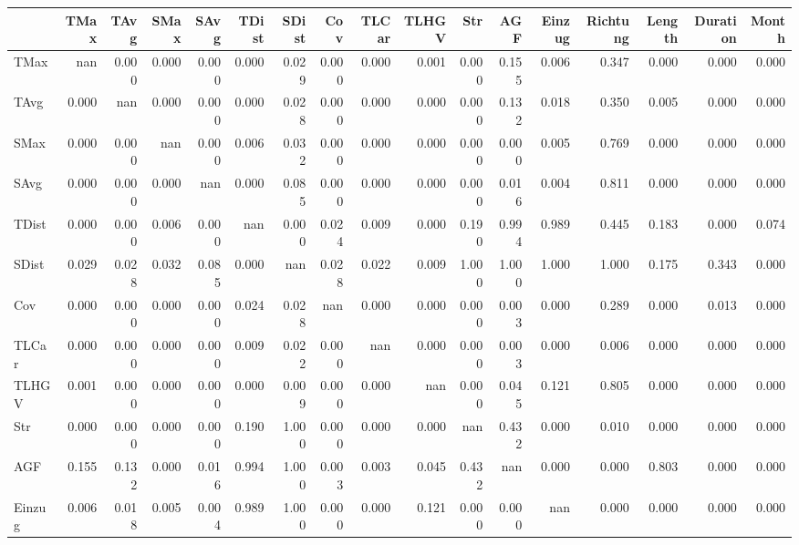 \begin{tabular}{lrrrrrrrrrrrrrrrr}
\toprule
{} &  TMax &  TAvg &  SMax &  SAvg &  TDist &  SDist &   Cov &  TLCar &  TLHGV &   Str &   AGF &  Einzug &  Richtung &  Length &  Duration &  Month \\
\midrule
TMax     &   nan & 0.000 & 0.000 & 0.000 &  0.000 &  0.029 & 0.000 &  0.000 &  0.001 & 0.000 & 0.155 &   0.006 &     0.347 &   0.000 &     0.000 &  0.000 \\
TAvg     & 0.000 &   nan & 0.000 & 0.000 &  0.000 &  0.028 & 0.000 &  0.000 &  0.000 & 0.000 & 0.132 &   0.018 &     0.350 &   0.005 &     0.000 &  0.000 \\
SMax     & 0.000 & 0.000 &   nan & 0.000 &  0.006 &  0.032 & 0.000 &  0.000 &  0.000 & 0.000 & 0.000 &   0.005 &     0.769 &   0.000 &     0.000 &  0.000 \\
SAvg     & 0.000 & 0.000 & 0.000 &   nan &  0.000 &  0.085 & 0.000 &  0.000 &  0.000 & 0.000 & 0.016 &   0.004 &     0.811 &   0.000 &     0.000 &  0.000 \\
TDist    & 0.000 & 0.000 & 0.006 & 0.000 &    nan &  0.000 & 0.024 &  0.009 &  0.000 & 0.190 & 0.994 &   0.989 &     0.445 &   0.183 &     0.000 &  0.074 \\
SDist    & 0.029 & 0.028 & 0.032 & 0.085 &  0.000 &    nan & 0.028 &  0.022 &  0.009 & 1.000 & 1.000 &   1.000 &     1.000 &   0.175 &     0.343 &  0.000 \\
Cov      & 0.000 & 0.000 & 0.000 & 0.000 &  0.024 &  0.028 &   nan &  0.000 &  0.000 & 0.000 & 0.003 &   0.000 &     0.289 &   0.000 &     0.013 &  0.000 \\
TLCar    & 0.000 & 0.000 & 0.000 & 0.000 &  0.009 &  0.022 & 0.000 &    nan &  0.000 & 0.000 & 0.003 &   0.000 &     0.006 &   0.000 &     0.000 &  0.000 \\
TLHGV    & 0.001 & 0.000 & 0.000 & 0.000 &  0.000 &  0.009 & 0.000 &  0.000 &    nan & 0.000 & 0.045 &   0.121 &     0.805 &   0.000 &     0.000 &  0.000 \\
Str      & 0.000 & 0.000 & 0.000 & 0.000 &  0.190 &  1.000 & 0.000 &  0.000 &  0.000 &   nan & 0.432 &   0.000 &     0.010 &   0.000 &     0.000 &  0.000 \\
AGF      & 0.155 & 0.132 & 0.000 & 0.016 &  0.994 &  1.000 & 0.003 &  0.003 &  0.045 & 0.432 &   nan &   0.000 &     0.000 &   0.803 &     0.000 &  0.000 \\
Einzug   & 0.006 & 0.018 & 0.005 & 0.004 &  0.989 &  1.000 & 0.000 &  0.000 &  0.121 & 0.000 & 0.000 &     nan &     0.000 &   0.000 &     0.000 &  0.000 \\

\end{tabular}
